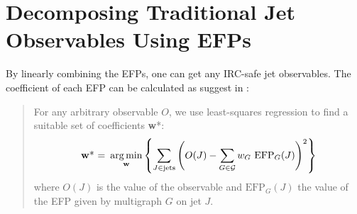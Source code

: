 \documentclass[12pt]{article}
\DeclareMathOperator*{\argmin}{arg\,min}
\begin{document}

\section{Decomposing Traditional Jet Observables Using EFPs}
By linearly combining the EFPs, one can get any IRC-safe jet observables. The coefficient of each EFP can be calculated as suggest in \cite{EFP}:
\begin{quote}
    For any arbitrary observable $O$, we use least-squares regression to find a suitable set of coefficients \textbf{w}*:
    \begin{equation}
        \label{eq:linregcoef}
        \text{\textbf{w}* = }\argmin_{\text{\textbf{w}}} \left \{ \sum_{J\in \text{jets}}\left ( O(J)-\sum_{G \in \mathcal{G}}w_G\text{ EFP}_G(J) \right )^2 \right \}
    \end{equation}
    where $O(J)$ is the value of the observable and $\text{EFP}_G(J)$ the value of the EFP given by
    multigraph $G$ on jet $J$.
\end{quote}
\end{document}
